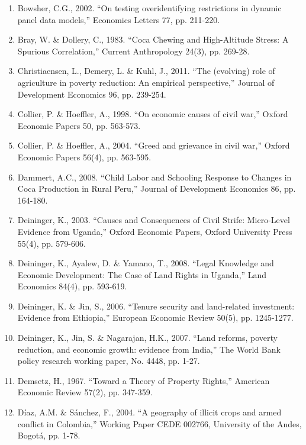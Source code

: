\documentclass[12pt,a4paper,english]{article}%
\begin{document}
\begin{enumerate}
\item Bowsher, C.G., 2002. ``On testing overidentifying restrictions in dynamic panel data models,'' Economics Letters 77, pp. 211-220.

\item Bray, W. \& Dollery, C., 1983. ``Coca Chewing and High-Altitude Stress: A Spurious Correlation,'' Current Anthropology 24(3), pp. 269-28.

\item Christiaensen, L., Demery, L. \& Kuhl, J., 2011. ``The (evolving) role of agriculture in poverty reduction: An empirical perspective,'' Journal of Development Economics 96, pp. 239-254.

\item Collier, P. \& Hoeffler, A., 1998. ``On economic causes of civil war,'' Oxford Economic Papers 50, pp. 563-573.

\item Collier, P. \& Hoeffler, A., 2004. ``Greed and grievance in civil war,'' Oxford Economic Papers 56(4), pp. 563-595.

\item Dammert, A.C., 2008. ``Child Labor and Schooling Response to Changes in Coca Production in Rural Peru,'' Journal of Development Economics 86, pp. 164-180.

\item Deininger, K., 2003. ``Causes and Consequences of Civil Strife: Micro-Level Evidence from Uganda,'' Oxford Economic Papers, Oxford University Press 55(4), pp. 579-606.

\item Deininger, K., Ayalew, D. \& Yamano, T., 2008. ``Legal Knowledge and Economic Development: The Case of Land Rights in Uganda,'' Land Economics 84(4), pp. 593-619.

\item Deininger, K. \& Jin, S., 2006. ``Tenure security and land-related investment: Evidence from Ethiopia,'' European Economic Review 50(5), pp. 1245-1277.

\item Deininger, K., Jin, S. \& Nagarajan, H.K., 2007. ``Land reforms, poverty reduction, and economic growth: evidence from India,'' The World Bank policy research working paper, No. 4448, pp. 1-27.

\item Demsetz, H., 1967. ``Toward a Theory of Property Rights,'' American Economic Review 57(2), pp. 347-359.

\item D\'{i}az, A.M. \& S\'{a}nchez, F., 2004. ``A geography of illicit crops and armed conflict in Colombia,'' Working Paper CEDE 002766, University of the Andes, Bogot\'{a}, pp. 1-78.


\end{enumerate}
\end{document}

